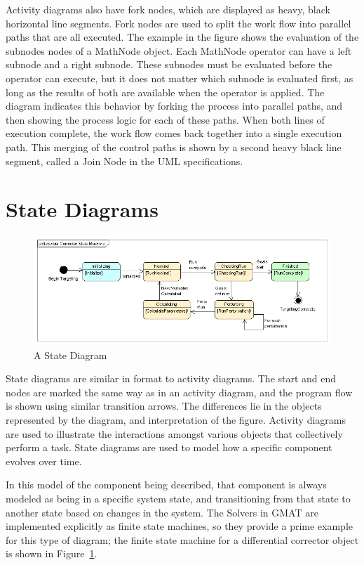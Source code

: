 Activity diagrams also have fork nodes, which are displayed as heavy, black horizontal line
segments.  Fork nodes are used to split the work flow into parallel paths that are all executed. 
The example in the figure shows the evaluation of the subnodes nodes of a MathNode object.  Each
MathNode operator can have a left subnode and a right subnode.  These subnodes must be evaluated
before the operator can execute, but it does not matter which subnode is evaluated first, as long as
the results of both are available when the operator is applied.  The diagram indicates this behavior
by forking the process into parallel paths, and then showing the process logic for each of these
paths.  When both lines of execution complete, the work flow comes back together into a single
execution path.  This merging of the control paths is shown by a second heavy black line segment,
called a Join Node in the UML specifications.

\section{State Diagrams}

\begin{figure}[htb]
\begin{center}
\includegraphics[400,158]{Images/UmlStateSample.png}
\caption{\label{figure:UmlStateExample}A State Diagram}
\end{center}
\end{figure}

State diagrams are similar in format to activity diagrams.  The start and end nodes are marked the
same way as in an activity diagram, and the program flow is shown using similar transition arrows. 
The differences lie in the objects represented by the diagram, and interpretation of the figure. 
Activity diagrams are used to illustrate the interactions amongst various objects that collectively
perform a task.  State diagrams are used to model how a specific component evolves over time.

In this model of the component being described, that component is always modeled as being in a
specific system state, and transitioning from that state to another state based on changes in the
system.  The Solvers in GMAT are implemented explicitly as finite state machines, so they provide a
prime example for this type of diagram; the finite state machine for a differential corrector object
is shown in Figure~\ref{figure:UmlStateExample}.

